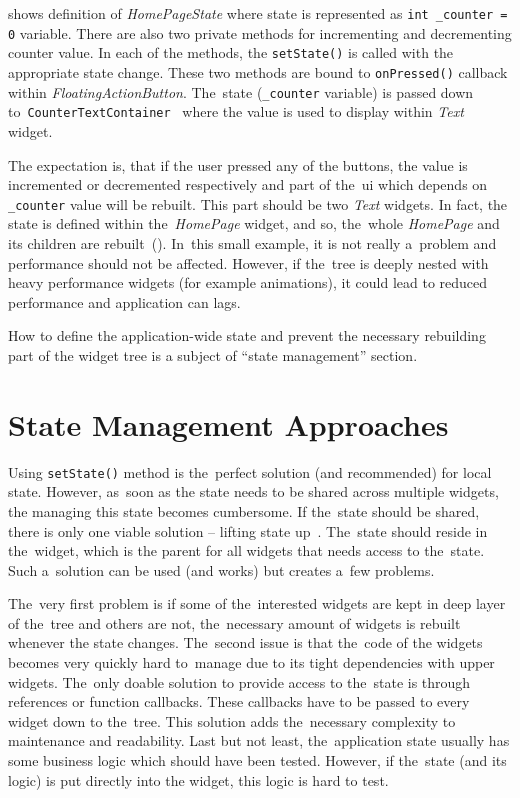  shows definition of \textit{HomePageState} where state is represented as \verb|int _counter = 0| variable. There are also two private methods for incrementing and decrementing counter value. In each of the methods, the \verb|setState()| is called with the appropriate state change.  These two methods are bound to \verb|onPressed()| callback within \textit{FloatingActionButton}. The~state (\verb|_counter| variable) is passed down to~\verb|CounterTextContainer|~ where the value is used to display within \textit{Text} widget. 

The expectation is, that if the user pressed any of the buttons, the value is incremented or decremented respectively and part of the~\gls{ui} which depends on \verb|_counter| value will be rebuilt. This part should be two \textit{Text} widgets. In fact, the state is defined within the~\textit{HomePage} widget, and so, the~whole \textit{HomePage} and its children are rebuilt~(). In~this small example, it is not really a~problem and performance should not be affected. However, if the~tree is deeply nested with heavy performance widgets (for example animations), it could lead to reduced performance and application can lags. 

How to define the application-wide state and prevent the necessary rebuilding part of the widget tree is a subject of ``state management'' section.
\section{State Management Approaches}
Using \verb|setState()| method is the~perfect solution (and recommended) for local state. However, as~soon as the state needs to be shared across multiple widgets, the managing this state becomes cumbersome. If the~state should be shared, there is only one viable solution -- lifting state up~\cite{flutter-simple-state-management}. The~state should reside in the~widget, which is the parent for all widgets that needs access to the~state. Such a~solution can be used (and works) but creates a~few problems. 

The~very first problem is if some of the~interested widgets are kept in deep layer of the~tree and others are not, the~necessary amount of widgets is rebuilt whenever the state changes. The~second issue is that the~code of the widgets becomes very quickly hard to~manage due to its tight dependencies with upper widgets. The~only doable solution to provide access to the~state is through references or function callbacks. These callbacks have to be passed to every widget down to the~tree. This solution adds the~necessary complexity to maintenance and readability. Last but not least, the~application state usually has some business logic which should have been tested. However, if the~state (and its logic) is put directly into the widget, this logic is hard to test. 

